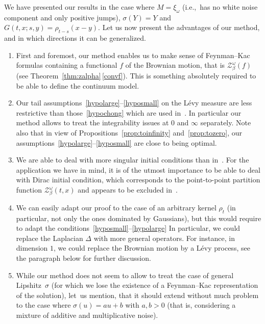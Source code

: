 \documentclass[11pt]{article}
\newcommand{\ie}{i.e.,\xspace}
\numberwithin{equation}{section}
\let\mathcal\mathscr
\newenvironment{enumeratea}
{\bgroup\def\theenumi{\alph{enumi}}\begin{enumerate}}
{\end{enumerate}\egroup}
\theoremstyle{definition}
\newcommand{\cZ}{{\ensuremath{\mathcal Z}} }
\let\gb\beta
\let\gD\Delta
\let\go\omega
\begin{document}
We have presented our results in the case where
$M=\xi_{\go}$ (\ie ~has no white noise component and only positive jumps), $\sigma(Y)=Y$ and $G(t,x ;s,y) =\rho_{t-s}(x-y)$.
Let us now present the advantages of our method, and in which directions it can be generalized.
\begin{enumeratea}
\item
First and foremost, our method enables us to make sense of Feynman--Kac formulas containing a functional $f$ of the Brownian motion, that is $\cZ^\go_{\beta}(f)$ (see Theorem~\ref{thm:zalpha}\,\eqref{convf}). This is something absolutely required to be able to define the continuum model.

\item
Our tail assumptions~\eqref{hypolarge}--\eqref{hyposmall} on the Lévy measure are less restrictive
than those~\eqref{hypochong} which are used in~\cite{Chong17}. In particular our method allows to treat the integrability issues at $0$ and $\infty$ separately.
Note also that in view of Propositions~\ref{prop:toinfinity} and~\ref{prop:tozero}, our assumptions~\eqref{hypolarge}--\eqref{hyposmall} are close to being optimal.

\item
We are able to deal with more singular initial conditions
than in~\cite{Chong17}. For the application we have in mind, it is of the utmost importance to be able to deal with Dirac initial condition, which corresponds to the point-to-point partition function $\cZ_{\gb}^{\go}(t,x)$ and appears to be excluded in~\cite{Chong17}.

\item
We can easily adapt our proof to the case
of an arbitrary kernel $\rho_t$ (in particular, not only the ones dominated by Gaussians), but this would require to adapt
the conditions~\eqref{hyposmall}--\eqref{hypolarge}
In particular, we could replace the Laplacian $\gD$ with more general operators. For instance, in dimension $1$, we could replace the Brownian motion by a Lévy process,
see the paragraph below for further discussion.

\item
While our method does not seem to allow to treat the case of general Lipshitz~$\sigma$ (for which we lose the existence of a Feynman--Kac representation of the solution), let~us mention, that it should extend without much problem to the case where \hbox{$\sigma(u)=au+b$} with $a,b>0$ (that is, considering a mixture of additive and multiplicative noise).


\end{enumeratea}
\end{document}
